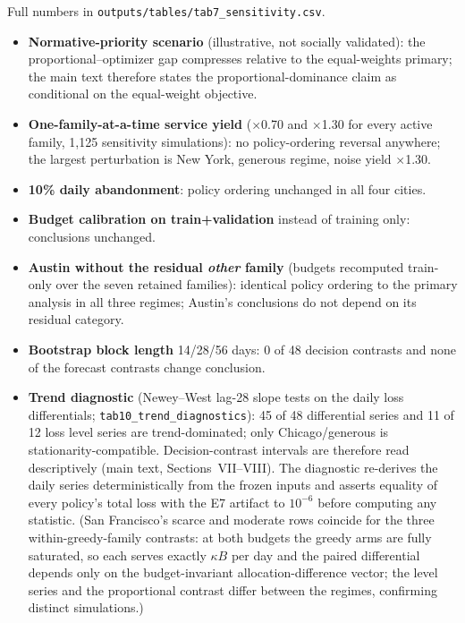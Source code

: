 Full numbers in \texttt{outputs/tables/tab7\_sensitivity.csv}.
\begin{itemize}
\item \textbf{Normative-priority scenario} (illustrative, not socially
validated): the proportional--optimizer gap compresses relative to the
equal-weights primary; the main text therefore states the
proportional-dominance claim as conditional on the equal-weight objective.
\item \textbf{One-family-at-a-time service yield} ($\times$0.70 and
$\times$1.30 for every active family, 1{,}125 sensitivity simulations):
no policy-ordering reversal anywhere; the largest perturbation is New
York, generous regime, noise yield $\times$1.30.
\item \textbf{10\% daily abandonment}: policy ordering unchanged in all
four cities.
\item \textbf{Budget calibration on train+validation} instead of
training only: conclusions unchanged.
\item \textbf{Austin without the residual \emph{other} family} (budgets
recomputed train-only over the seven retained families): identical
policy ordering to the primary analysis in all three regimes; Austin's
conclusions do not depend on its residual category.
\item \textbf{Bootstrap block length} 14/28/56 days: 0 of 48 decision
contrasts and none of the forecast contrasts change conclusion.
\item \textbf{Trend diagnostic} (Newey--West lag-28 slope tests on the
daily loss differentials; \texttt{tab10\_trend\_diagnostics}): 45 of 48
differential series and 11 of 12 loss level series are trend-dominated;
only Chicago/generous is stationarity-compatible. Decision-contrast
intervals are therefore read descriptively (main text, Sections~VII--VIII).
The diagnostic re-derives the daily series deterministically from the
frozen inputs and asserts equality of every policy's total loss with the
E7 artifact to $10^{-6}$ before computing any statistic. (San
Francisco's scarce and moderate rows coincide for the three
within-greedy-family contrasts: at both budgets the greedy arms are
fully saturated, so each serves exactly $\kappa B$ per day and the
paired differential depends only on the budget-invariant
allocation-difference vector; the level series and the proportional
contrast differ between the regimes, confirming distinct simulations.)
\end{itemize}

\begin{landscape}
\noindent\scalebox{0.55}{%
}
\end{landscape}

